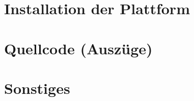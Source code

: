 \begin{appendices}
\section{Installation der Plattform}
\section{Quellcode (Auszüge)}
\section{Sonstiges}
\end{appendices}